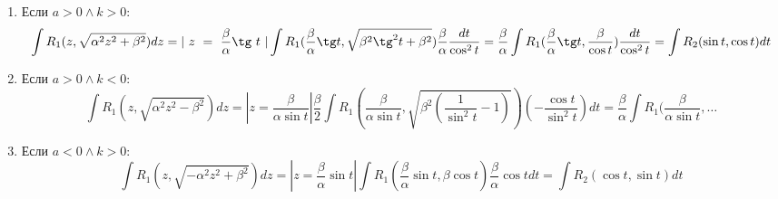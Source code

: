 \begin{enumerate}
	\item Если $a > 0 \land k > 0$:
	\[ \int R_1(z, \sqrt{\alpha^2 z^2 + \beta^2}) dz = |~z~=~\frac{\beta}{\alpha}\tg~t~|
	\int R_1(\frac{\beta}{\alpha} \tg t, \sqrt{\beta^2 \tg^2 t + \beta^2}) \frac\beta\alpha \frac{dt}{\cos^2 t} =
	\frac\beta\alpha \int R_1(\frac\beta\alpha \tg t, \frac\beta{\cos t}) \frac{dt}{\cos^2 t} =
	\int R_2(\sin t, \cos t) dt \]
	
	\item Если $a > 0 \land k < 0$:
	\[ \int R_1(z, \sqrt{\alpha^2 z^2 - \beta^2}) dz = | z = \frac\beta{\alpha \sin t} |
	\frac\beta2 \int R_1(\frac\beta{\alpha \sin t}, \sqrt{\beta^2 \left( \frac1{\sin^2 t} - 1 \right)}) \left( -\frac{\cos t}{\sin^2 t} \right) dt =
	\frac\beta\alpha \int R_1(\frac\beta{\alpha \sin t}, \ldots \]
	
	\item Если $a < 0 \land k > 0$:
	\[ \int R_1(z, \sqrt{-\alpha^2 z^2 + \beta^2}) dz = | z = \frac\beta\alpha \sin t |
	\int R_1(\frac\beta\alpha \sin t, \beta \cos t) \frac\beta\alpha \cos t dt =
	\int R_2(\cos t, \sin t) dt \]
\end{enumerate}